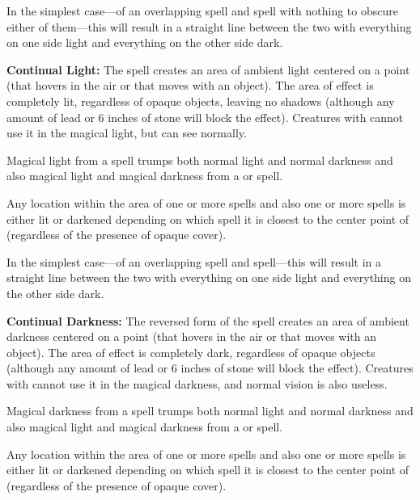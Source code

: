 \begin{multicols*}{2}
In the simplest case—of an overlapping  spell and  spell with nothing to obscure either of them—this will result in a straight line between the two with everything on one side light and everything on the other side dark.

\textbf{Continual Light:} The  spell creates an area of ambient light centered on a point (that hovers in the air or that moves with an object). The area of effect is completely lit, regardless of opaque objects, leaving no shadows (although any amount of lead or 6 inches of stone will block the effect). Creatures with  cannot use it in the magical light, but can see normally.

Magical light from a  spell trumps both normal light and normal darkness and also magical light and magical darkness from a  or  spell.

Any location within the area of one or more  spells and also one or more  spells is either lit or darkened depending on which spell it is closest to the center point of (regardless of the presence of opaque cover).

In the simplest case—of an overlapping  spell and  spell—this will result in a straight line between the two with everything on one side light and everything on the other side dark.

\textbf{Continual Darkness:} The reversed form of the  spell creates an area of ambient darkness centered on a point (that hovers in the air or that moves with an object). The area of effect is completely dark, regardless of opaque objects (although any amount of lead or 6 inches of stone will block the effect). Creatures with  cannot use it in the magical darkness, and normal vision is also useless.

Magical darkness from a  spell trumps both normal light and normal darkness and also magical light and magical darkness from a  or  spell.

Any location within the area of one or more  spells and also one or more  spells is either lit or darkened depending on which spell it is closest to the center point of (regardless of the presence of opaque cover).


\end{multicols*}
